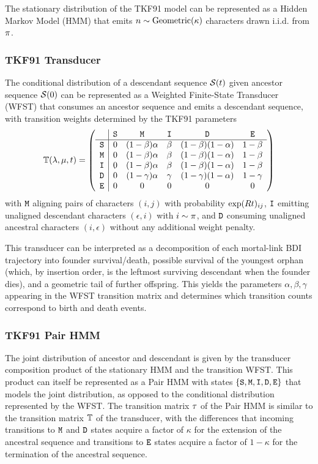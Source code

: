 The stationary distribution of the TKF91 model can be represented as a Hidden Markov Model (HMM) that emits $n \sim {\mbox{Geometric}}(\kappa)$ characters drawn i.i.d. from $\pi$.

\subsubsection{TKF91 Transducer}

The conditional distribution of a descendant sequence $\mathcal{S}(t)$ given ancestor sequence $\mathcal{S}(0)$
can be represented as a Weighted Finite-State Transducer (WFST) that consumes an ancestor sequence and emits a descendant sequence, with transition weights determined by the TKF91 parameters
\[
\mathbb{T}(\lambda,\mu,t) =
\left(
    \begin{array}{r|ccccc}
    & {\tt S} & {\tt M} & {\tt I} & {\tt D} & {\tt E} \\
    \hline
    {\tt S} & 0 & (1-\beta)\alpha & \beta & (1-\beta)(1-\alpha) & 1-\beta \\
    {\tt M} & 0 & (1-\beta)\alpha & \beta & (1-\beta)(1-\alpha) & 1-\beta \\
    {\tt I} & 0 & (1-\beta)\alpha & \beta & (1-\beta)(1-\alpha) & 1-\beta \\
    {\tt D} & 0 & (1-\gamma)\alpha & \gamma & (1-\gamma)(1-\alpha) & 1-\gamma \\
    {\tt E} & 0 & 0 & 0 & 0 & 0
    \end{array}
\right)
\]
with ${\tt M}$ aligning pairs of characters $(i,j)$ with probability $\exp(R t)_{ij}$,
${\tt I}$ emitting unaligned descendant characters $(\epsilon,i)$ with $i \sim \pi$, and ${\tt D}$ consuming unaligned ancestral characters $(i,\epsilon)$ without any additional weight penalty.

This transducer can be interpreted as a decomposition of each mortal-link BDI trajectory into founder survival/death, possible survival of the youngest orphan
(which, by insertion order, is the leftmost surviving descendant when the founder dies), and a geometric tail of further offspring. This yields the parameters
$\alpha,\beta,\gamma$
appearing in the WFST transition matrix and determines which transition counts correspond to birth and death events.

\subsubsection{TKF91 Pair HMM}

The joint distribution of ancestor and descendant is given by the transducer composition product of the stationary HMM and the transition WFST.
This product can itself be represented as a Pair HMM with states $\{{\tt S},{\tt M},{\tt I},{\tt D},{\tt E}\}$ that models the joint distribution, as opposed to the conditional distribution represented by the WFST.
The transition matrix $\tau$ of the Pair HMM is similar to the transition matrix $\mathbb{T}$ of the transducer,
with the differences that incoming transitions to ${\tt M}$ and ${\tt D}$ states acquire a factor of $\kappa$ for the extension of the ancestral sequence
and transitions to ${\tt E}$ states acquire a factor of $1-\kappa$ for the termination of the ancestral sequence.


